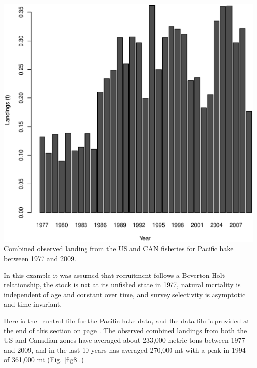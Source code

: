 \begin{multicols}{2}
\begin{figurehere}
	\centering
	\includegraphics[width=0.8\columnwidth]{iscamFigs/phakefig15.eps}\\
	\caption{Combined observed landing from the US and CAN fisheries for Pacific hake between 1977 and 2009.}\label{fig8}
\end{figurehere}

In this example it was assumed that recruitment follows a Beverton-Holt relationship, the stock is not at its unfished state in 1977, natural mortality is independent of age and constant over time, and survey selectivity is asymptotic and time-invariant.  


Here is the \iscam\ control file for the Pacific hake data, and the data file is provided at the end of this section on page \pageref{HakeDataFile}.  The observed combined landings from both the US and Canadian zones have averaged about 233,000 metric tons between 1977 and 2009, and in the last 10 years has averaged 270,000 mt with a peak in 1994 of 361,000 mt  (Fig. \ref{fig8}.)\\
\tiny
\noindent \hrulefill
\begin{alltt}

\end{alltt}
\hrulefill
\normalsize


%



\end{multicols}

